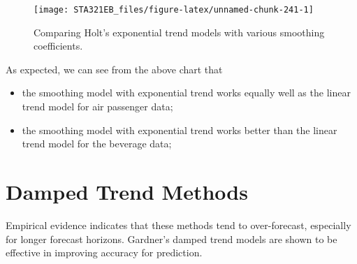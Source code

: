 \documentclass[
]{book}
\newenvironment{Shaded}{\begin{snugshade}}{\end{snugshade}}
\newcommand{\AttributeTok}[1]{\textcolor[rgb]{0.13,0.29,0.53}{#1}}
\newcommand{\DecValTok}[1]{\textcolor[rgb]{0.00,0.00,0.81}{#1}}
\newcommand{\DocumentationTok}[1]{\textcolor[rgb]{0.56,0.35,0.01}{\textbf{\textit{#1}}}}
\newcommand{\FunctionTok}[1]{\textcolor[rgb]{0.13,0.29,0.53}{\textbf{#1}}}
\newcommand{\NormalTok}[1]{#1}
\newcommand{\SpecialCharTok}[1]{\textcolor[rgb]{0.81,0.36,0.00}{\textbf{#1}}}
\newcommand{\StringTok}[1]{\textcolor[rgb]{0.31,0.60,0.02}{#1}}
\begin{document}
\begin{Shaded}
\end{Shaded}

\begin{figure}

{\centering \texttt{[image: STA321EB\_files/figure-latex/unnamed-chunk-241-1]} 

}

\caption{ Comparing Holt's exponential trend models with various smoothing coefficients.}\label{fig:unnamed-chunk-241}
\end{figure}

As expected, we can see from the above chart that

\begin{itemize}
\item
  the smoothing model with exponential trend works equally well as the linear trend model for air passenger data;
\item
  the smoothing model with exponential trend works better than the linear trend model for the beverage data;
\end{itemize}

\hypertarget{damped-trend-methods}{%
\section{Damped Trend Methods}\label{damped-trend-methods}}

Empirical evidence indicates that these methods tend to over-forecast, especially for longer forecast horizons. Gardner's damped trend models are shown to be effective in improving accuracy for prediction.
\end{document}
